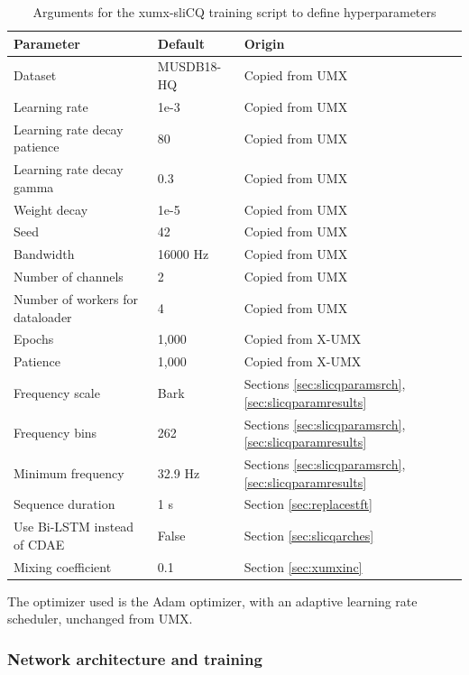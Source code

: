 \documentclass[report.tex]{subfiles}
\begin{document}
\begin{table}[ht]
	\centering
	\caption{Arguments for the xumx-sliCQ training script to define hyperparameters}
	\label{table:xumxslicqparams}
	\begin{tabular}{ |l|l|l| }
	 \hline
		Parameter & Default & Origin \\
	 \hline
	 \hline
		Dataset & MUSDB18-HQ & Copied from UMX \\
	 \hline
		Learning rate & 1e-3 & Copied from UMX \\
	 \hline
		Learning rate decay patience & 80 & Copied from UMX \\
	 \hline
		Learning rate decay gamma & 0.3 & Copied from UMX \\
	 \hline
		Weight decay & 1e-5 & Copied from UMX \\
	 \hline
	 	Seed & 42 & Copied from UMX \\
	 \hline
	 	Bandwidth & 16000 Hz & Copied from UMX \\
	 \hline
	 	Number of channels & 2 & Copied from UMX \\
	 \hline
	 	Number of workers for dataloader & 4 & Copied from UMX \\
	 \hline
		Epochs & 1,000 & Copied from X-UMX \\
	 \hline
		Patience & 1,000 & Copied from X-UMX \\
	 \hline
		Frequency scale & Bark & Sections \ref{sec:slicqparamsrch}, \ref{sec:slicqparamresults} \\
	 \hline
		Frequency bins & 262 & Sections \ref{sec:slicqparamsrch}, \ref{sec:slicqparamresults} \\
	 \hline
	 	Minimum frequency & 32.9 Hz & Sections \ref{sec:slicqparamsrch}, \ref{sec:slicqparamresults} \\
	 \hline
		Sequence duration & 1 s & Section \ref{sec:replacestft} \\
	 \hline
		Use Bi-LSTM instead of CDAE & False & Section \ref{sec:slicqarches}  \\
	 \hline
		Mixing coefficient & 0.1 & Section \ref{sec:xumxinc} \\
	 \hline
\end{tabular}
\end{table}

The optimizer used is the Adam optimizer, with an adaptive learning rate scheduler, unchanged from UMX.

\subsubsection{Network architecture and training}
\label{sec:networktraining}
\end{document}
